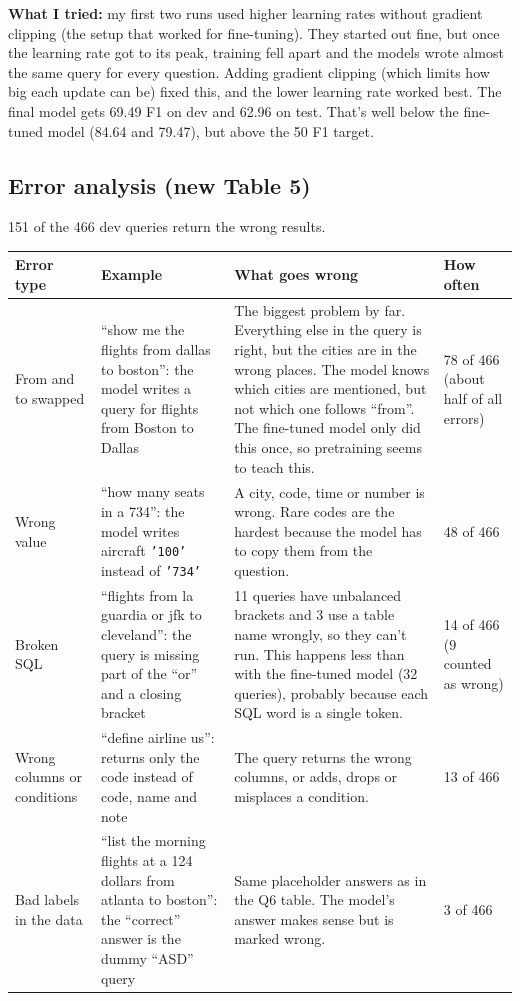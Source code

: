 \documentclass[11pt]{article}
\newcommand{\code}[1]{\texttt{#1}}
\begin{document}
\textbf{What I tried:} my first two runs used higher learning rates without gradient clipping
(the setup that worked for fine-tuning). They started out fine, but once the learning rate got to
its peak, training fell apart and the models wrote almost the same query for every question.
Adding gradient clipping (which limits how big each update can be) fixed this, and the lower
learning rate worked best. The final model gets 69.49 F1 on dev and 62.96 on test. That's well
below the fine-tuned model (84.64 and 79.47), but above the 50 F1 target.

\subsection*{Error analysis (new Table 5)}

151 of the 466 dev queries return the wrong results.

\begin{table}[H]
\centering\small
\begin{tabular}{|P{2.4cm}|P{4.6cm}|P{5.5cm}|P{2.2cm}|}
\hline
\textbf{Error type} & \textbf{Example} & \textbf{What goes wrong} & \textbf{How often} \\ \hline
From and to swapped &
``show me the flights from dallas to boston'': the model writes a query for flights from Boston to
Dallas &
The biggest problem by far. Everything else in the query is right, but the cities are in the wrong
places. The model knows which cities are mentioned, but not which one follows ``from''. The
fine-tuned model only did this once, so pretraining seems to teach this. &
78 of 466 (about half of all errors) \\ \hline
Wrong value &
``how many seats in a 734'': the model writes aircraft \code{'100'} instead of \code{'734'} &
A city, code, time or number is wrong. Rare codes are the hardest because the model has to copy
them from the question. &
48 of 466 \\ \hline
Broken SQL &
``flights from la guardia or jfk to cleveland'': the query is missing part of the ``or'' and a
closing bracket &
11 queries have unbalanced brackets and 3 use a table name wrongly, so they can't run. This
happens less than with the fine-tuned model (32 queries), probably because each SQL word is a
single token. &
14 of 466 (9 counted as wrong) \\ \hline
Wrong columns or conditions &
``define airline us'': returns only the code instead of code, name and note &
The query returns the wrong columns, or adds, drops or misplaces a condition. &
13 of 466 \\ \hline
Bad labels in the data &
``list the morning flights at a 124 dollars from atlanta to boston'': the ``correct'' answer is the
dummy ``ASD'' query &
Same placeholder answers as in the Q6 table. The model's answer makes sense but is marked wrong. &
3 of 466 \\ \hline
\end{tabular}
\end{table}
\end{document}
